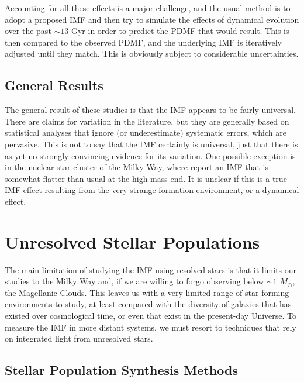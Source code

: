 Accounting for all these effects is a major challenge, and the usual method is to adopt a proposed IMF and then try to simulate the effects of dynamical evolution over the past $\sim 13$ Gyr in order to predict the PDMF that would result. This is then compared to the observed PDMF, and the underlying IMF is iteratively adjusted until they match. This is obviously subject to considerable uncertainties.

\subsection{General Results}

The general result of these studies is that the IMF appears to be fairly universal. There are claims for variation in the literature, but they are generally based on statistical analyses that ignore (or underestimate) systematic errors, which are pervasive. This is not to say that the IMF certainly is universal, just that there is as yet no strongly convincing evidence for its variation. One possible exception is in the nuclear star cluster of the Milky Way, where \citet{lu13a} report an IMF that is somewhat flatter than usual at the high mass end. It is unclear if this is a true IMF effect resulting from the very strange formation environment, or a dynamical effect.


\section{Unresolved Stellar Populations}

The main limitation of studying the IMF using resolved stars is that it limits our studies to the Milky Way and, if we are willing to forgo observing below $\sim 1$ $M_\odot$, the Magellanic Clouds. This leaves us with a very limited range of star-forming environments to study, at least compared with the diversity of galaxies that has existed over cosmological time, or even that exist in the present-day Universe. To measure the IMF in more distant systems, we must resort to techniques that rely on integrated light from unresolved stars.

\subsection{Stellar Population Synthesis Methods}

